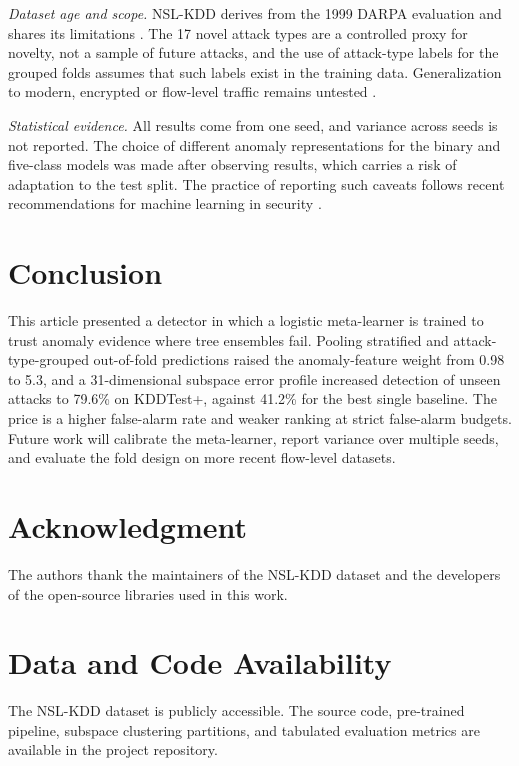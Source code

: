 \documentclass[journal]{IEEEtran}
\begin{document}
\emph{Dataset age and scope.} NSL-KDD derives from the 1999 DARPA evaluation and shares its limitations \cite{mchugh2000,mahoney2003}. The 17 novel attack types are a controlled proxy for novelty, not a sample of future attacks, and the use of attack-type labels for the grouped folds assumes that such labels exist in the training data. Generalization to modern, encrypted or flow-level traffic remains untested \cite{ring2019,engelen2021}.

\emph{Statistical evidence.} All results come from one seed, and variance across seeds is not reported. The choice of different anomaly representations for the binary and five-class models was made after observing results, which carries a risk of adaptation to the test split. The practice of reporting such caveats follows recent recommendations for machine learning in security \cite{arp2022,sommer2010}.

\section{Conclusion}
\label{sec:conclusion}
This article presented a detector in which a logistic meta-learner is trained to trust anomaly evidence where tree ensembles fail. Pooling stratified and attack-type-grouped out-of-fold predictions raised the anomaly-feature weight from 0.98 to 5.3, and a 31-dimensional subspace error profile increased detection of unseen attacks to 79.6\% on KDDTest+, against 41.2\% for the best single baseline. The price is a higher false-alarm rate and weaker ranking at strict false-alarm budgets. Future work will calibrate the meta-learner, report variance over multiple seeds, and evaluate the fold design on more recent flow-level datasets.

\section*{Acknowledgment}
The authors thank the maintainers of the NSL-KDD dataset and the developers of the open-source libraries used in this work.

\section*{Data and Code Availability}
The NSL-KDD dataset is publicly accessible. The source code, pre-trained pipeline, subspace clustering partitions, and tabulated evaluation metrics are available in the project repository.
\end{document}
